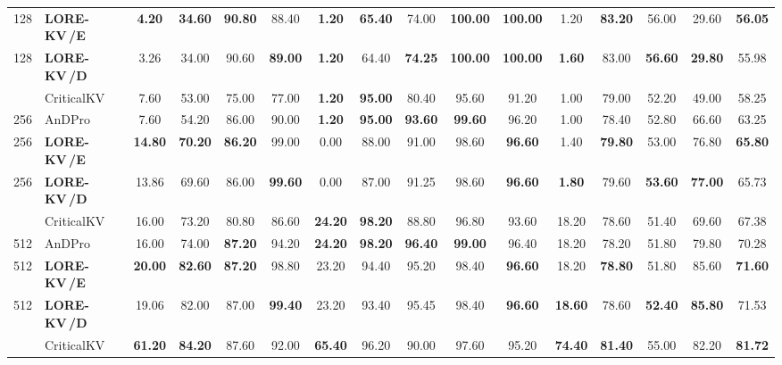 \documentclass{article} %
\newcommand{\best}[1]{\textcolor{bestblue}{\textbf{#1}}}
\newcommand{\second}[1]{\textcolor{secondorange}{#1}}
\newcommand{\lorekvE}{LORE-KV\,/E}
\newcommand{\lorekvD}{LORE-KV\,/D}
\begin{document}
\begin{table}[p]
{\begin{tabular}{llcccccccccccccc}
128 & \textbf{\lorekvE} & \best{4.20} & \best{34.60} & \best{90.80} & \second{88.40} & \best{1.20} & \best{65.40} & \second{74.00} & \best{100.00} & \best{100.00} & \second{1.20} & \best{83.20} & \second{56.00} & \second{29.60} & \best{56.05} \\
128 & \textbf{\lorekvD} & \second{3.26} & \second{34.00} & \second{90.60} & \best{89.00} & \best{1.20} & \second{64.40} & \best{74.25} & \best{100.00} & \best{100.00} & \best{1.60} & \second{83.00} & \best{56.60} & \best{29.80} & \second{55.98} \\
\addlinespace[2pt]
256 & CriticalKV & 7.60 & 53.00 & 75.00 & 77.00 & \best{1.20} & \best{95.00} & 80.40 & 95.60 & 91.20 & 1.00 & 79.00 & 52.20 & 49.00 & 58.25 \\
256 & AnDPro & 7.60 & 54.20 & \second{86.00} & 90.00 & \best{1.20} & \best{95.00} & \best{93.60} & \best{99.60} & \second{96.20} & 1.00 & 78.40 & 52.80 & 66.60 & 63.25 \\
256 & \textbf{\lorekvE} & \best{14.80} & \best{70.20} & \best{86.20} & \second{99.00} & \second{0.00} & \second{88.00} & 91.00 & \second{98.60} & \best{96.60} & \second{1.40} & \best{79.80} & \second{53.00} & \second{76.80} & \best{65.80} \\
256 & \textbf{\lorekvD} & \second{13.86} & \second{69.60} & \second{86.00} & \best{99.60} & \second{0.00} & 87.00 & \second{91.25} & \second{98.60} & \best{96.60} & \best{1.80} & \second{79.60} & \best{53.60} & \best{77.00} & \second{65.73} \\
\addlinespace[2pt]
512 & CriticalKV & 16.00 & 73.20 & 80.80 & 86.60 & \best{24.20} & \best{98.20} & 88.80 & 96.80 & 93.60 & \second{18.20} & \second{78.60} & 51.40 & 69.60 & 67.38 \\
512 & AnDPro & 16.00 & 74.00 & \best{87.20} & 94.20 & \best{24.20} & \best{98.20} & \best{96.40} & \best{99.00} & \second{96.40} & \second{18.20} & 78.20 & \second{51.80} & 79.80 & 70.28 \\
512 & \textbf{\lorekvE} & \best{20.00} & \best{82.60} & \best{87.20} & \second{98.80} & \second{23.20} & \second{94.40} & 95.20 & \second{98.40} & \best{96.60} & \second{18.20} & \best{78.80} & \second{51.80} & \second{85.60} & \best{71.60} \\
512 & \textbf{\lorekvD} & \second{19.06} & \second{82.00} & \second{87.00} & \best{99.40} & \second{23.20} & 93.40 & \second{95.45} & \second{98.40} & \best{96.60} & \best{18.60} & \second{78.60} & \best{52.40} & \best{85.80} & \second{71.53} \\
\addlinespace[2pt]
1024 & CriticalKV & \best{61.20} & \best{84.20} & 87.60 & 92.00 & \best{65.40} & 96.20 & 90.00 & 97.60 & \second{95.20} & \best{74.40} & \best{81.40} & 55.00 & 82.20 & \best{81.72} \\

\end{tabular}}
\end{table}
\end{document}
